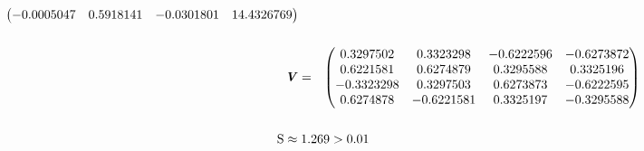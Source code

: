 \documentclass[a4paper, 14pt]{extarticle}
\begin{document}
\begin{center}
{\begin{minipage}{1.3\textwidth}
\begin{multicols}{2}
\begin{gather*}
\begin{aligned}
\begin{pmatrix}
                -0.0005047 & 0.5918141 & -0.0301801 & 14.4326769 \\
              \end{pmatrix}\\[1.5em]
              \textbf{\textit{V}} &= 
              &\begin{pmatrix}
                0.3297502 & 0.3323298 & -0.6222596 & -0.6273872 \\
                0.6221581 & 0.6274879 & 0.3295588 & 0.3325196 \\
                -0.3323298 & 0.3297503 & 0.6273873 & -0.6222595 \\
                0.6274878 & -0.6221581 & 0.3325197 & -0.3295588 \\
              \end{pmatrix}\\
            \end{aligned} \\\\
            \text{S} \approx 1.269 > 0.01
        \end{gather*}
      \end{multicols}
  \end{minipage}
  } 
\end{center}
\vspace*{\fill}

\newpage
\end{document}
